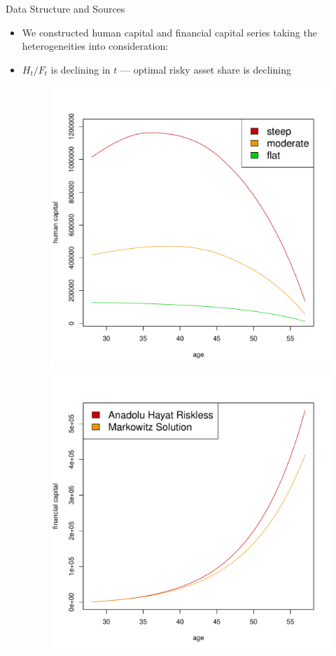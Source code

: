 \documentclass{beamer}
\begin{document}
\begin{frame}[allowframebreaks]{Data Structure and Sources}
\begin{itemize}
\framebreak

	\item We constructed human capital and financial capital series taking the heterogeneities into consideration:
	\item $H_t/F_t$ is declining in $t$ --- optimal risky asset share is declining

\begin{figure}[h]
		\includegraphics[scale=0.25]{figs/humancapital.pdf}
		\includegraphics[scale=0.25]{figs/fincapital.pdf}
\end{figure}

  \end{itemize}
\end{frame}
\end{document}
